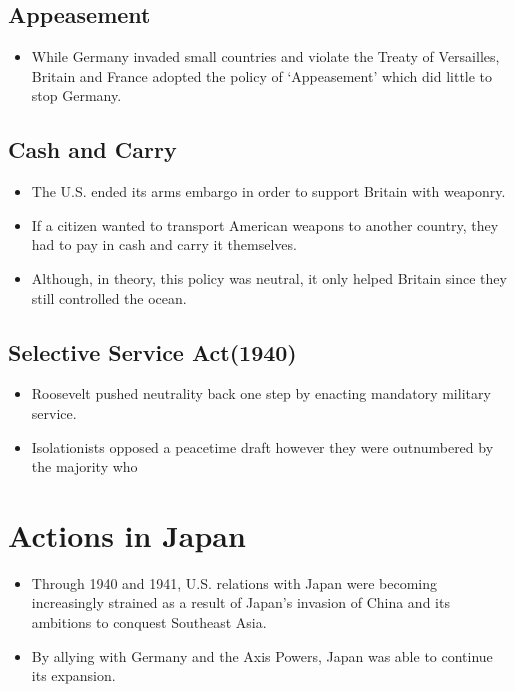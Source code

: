 \documentclass[12pt]{article} %
\begin{document}
	\subsection{Appeasement}
	\begin{itemize}
		\item While Germany invaded small countries and violate the Treaty of Versailles, Britain and France
			adopted the policy of `Appeasement' which did little to stop Germany.
	\end{itemize}

	\subsection{Cash and Carry}
	\begin{itemize}
		\item The U.S. ended its arms embargo in order to support Britain with weaponry.
		\item If a citizen wanted to transport American weapons to another country, they had to pay in cash
			and carry it themselves.
		\item Although, in theory, this policy was neutral, it only helped Britain since they still controlled
			the ocean.
	\end{itemize}

	\subsection{Selective Service Act(1940)}
	\begin{itemize}
		\item Roosevelt pushed neutrality back one step by enacting mandatory military service.
		\item Isolationists opposed a peacetime draft however they were outnumbered by the majority who 
	\end{itemize}

	\section{Actions in Japan}
	\begin{itemize}
		\item Through 1940 and 1941, U.S. relations with Japan were becoming increasingly strained as a result
			of Japan's invasion of China and its ambitions to conquest Southeast Asia.
		\item By allying with Germany and the Axis Powers, Japan was able to continue its expansion.
	\end{itemize}
\end{document}
